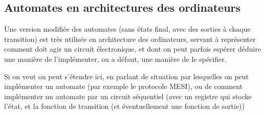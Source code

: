 \subsection{Automates en architectures des ordinateurs}

Une version modifiée des automates (sans états final, avec des sorties à chaque transition) est très utilisée en architecture des ordinateurs, servant à représenter comment doit agir un circuit électronique, et dont on peut parfois espérer déduire une manière de l'implémenter, ou a défaut, une manière de le spécifier.

\begin{com}
	Si on veut on peut s'étendre ici, en parlant de situation par lesquelles on peut implémenter un automate (par exemple le protocole MESI), ou de comment implémenter un automate par un circuit séquentiel (avec un registre qui stocke l'état, et la fonction de transition (et éventuellement une fonction de sortie))
\end{com}
